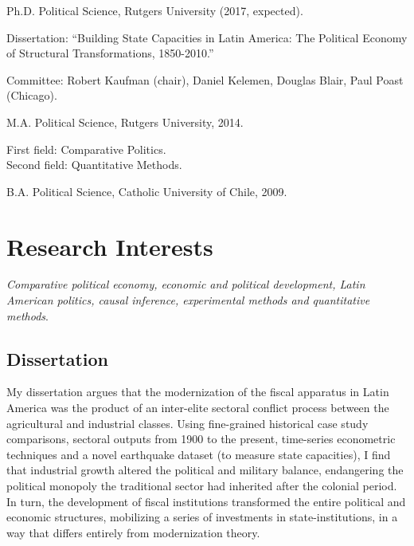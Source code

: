 \documentclass[letterpaper]{article}
\renewenvironment{itemize}{
  \begin{list}{}{
    \setlength{\leftmargin}{1.5em}
  }
}{
  \end{list}
}
\begin{document}
\begin{itemize}
  \item Ph.D. Political Science, Rutgers University (2017, expected).

    	\begin{itemize}

		\item Dissertation: ``Building State Capacities in Latin America: The Political Economy of Structural Transformations, 1850-2010.''

		\item Committee: Robert Kaufman (chair), Daniel Kelemen, Douglas Blair, Paul Poast (Chicago).
		\end{itemize}

  \item M.A. Political Science, Rutgers University, 2014.

  	\begin{itemize}
  	
  		\item 	First field: {\small Comparative Politics}. \\ 
  				Second field: {\small Quantitative Methods}.
	\end{itemize}


  \item B.A. Political Science, Catholic University of Chile, 2009.
\end{itemize}


\section*{Research Interests}

\emph{Comparative political economy, economic and political development, Latin American politics, causal inference, experimental methods and quantitative methods}.

\subsection*{Dissertation}

My dissertation argues that the modernization of the fiscal apparatus in Latin America was the product of an inter-elite sectoral conflict process between the agricultural and industrial classes. Using fine-grained historical case study comparisons, sectoral outputs from 1900 to the present, time-series econometric techniques and a novel earthquake dataset (to measure state capacities), I find that industrial growth altered the political and military balance, endangering the political monopoly the traditional sector had inherited after the colonial period. In turn, the development of fiscal institutions transformed the entire political and economic structures, mobilizing a series of investments in state-institutions, in a way that differs entirely from modernization theory.
\end{document}
